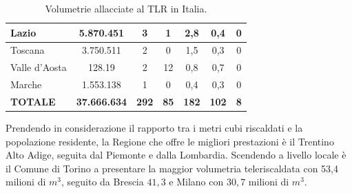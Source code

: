 \documentclass[laurea,oneside,11pt]{USiena_tesiLM3}
\begin{document}
\begin{table}[!ht]
{\begin{tabular}{|l|c|c|c|c|c|c|}
Lazio                             & 5.870.451                                           & 3                                & 1                                     & 2,8                                        & 0,4                                     & 0                                         \\ \hline
Toscana                           & 3.750.511                                           & 2                                & 0                                     & 1,5                                        & 0,3                                     & 0                                         \\ \hline
Valle d'Aosta                     & 128.19                                              & 2                                & 12                                    & 0,8                                        & 0,7                                     & 0                                         \\ \hline
Marche                            & 1.553.138                                           & 1                                & 0                                     & 0,4                                        & 0,3                                     & 0                                         \\ \hline
\textbf{TOTALE}                   & \textbf{37.666.634}                                 & \textbf{292}                     & \textbf{85}                           & \textbf{182}                               & \textbf{102}                            & \textbf{8}                                \\ \hline
\end{tabular}}
\caption{Volumetrie allacciate al TLR in Italia.}
\label{tab:volumetrie_teleriscaldamento}
\end{table}

Prendendo in considerazione il rapporto tra i metri cubi riscaldati e la popolazione
residente, la Regione che offre le migliori prestazioni è il Trentino Alto Adige, seguita dal Piemonte e dalla Lombardia. 
Scendendo a livello locale è il Comune di Torino a presentare la maggior volumetria teleriscaldata con 53,4 milioni di $m^3$, seguito da Brescia $41,3$ e Milano con $30,7$ milioni di $m^3$.\\
\end{document}

